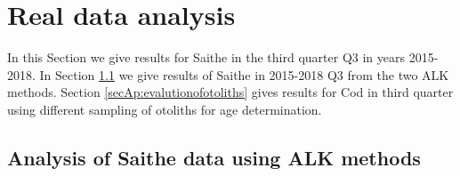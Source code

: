 \documentclass[a4paper 12pt]{article}
\numberwithin{equation}{section}
\begin{document}
\section{Real data analysis}
\label{secAP:realdataanalysis}

In this Section we give results for Saithe in the third quarter Q3  in years 2015-2018. In Section \ref{secAp:saitheusing ALKmethods} we give results of Saithe in 2015-2018 Q3 from the two ALK methods. Section \ref{secAp:evalutionofotoliths} gives results for Cod in third quarter using different sampling of otoliths for age determination.



\subsection{Analysis of Saithe data using ALK methods}
\label{secAp:saitheusing ALKmethods}
\clearpage
\end{document}
